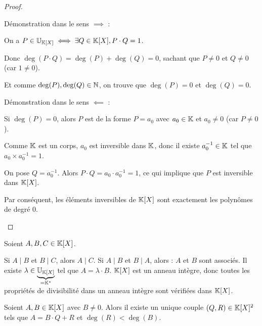 \documentclass[12pt,a4paper]{report}
\begin{document}
\begin{proof}
    \begin{outline}
        \1 Démonstration dans le sens $\implies$ :

        \2 On a $P \in \mathbb{U}_{\mathbb{K}[X]} \iff \exists Q \in \mathbb{K}[X], P\cdot Q = 1$.

        \2 Donc $\deg(P\cdot Q) = \deg(P) + \deg(Q) = 0$, sachant que $P \ne 0$ et $Q \ne 0$ (car $1 \ne 0$).

        \2 Et comme $\deg(P), \deg(Q) \in \mathbb{N}$, on trouve que $\deg(P) = 0$ et $\deg(Q) = 0$.

        \1 Démonstration dans le sens $\impliedby$ :

        \2 Si $\deg(P) = 0$, alors $P$ est de la forme $P = a_0$ avec $a_0 \in \mathbb{K}$ et $a_0 \ne 0$ (car $P \ne 0$).

        \2 Comme $\mathbb{K}$ est un corps, $a_0$ est inversible dans $\mathbb{K}$, donc il existe $a_0^{-1} \in \mathbb{K}$ tel que $a_0 \times a_0^{-1} = 1$.

        \2 On pose $Q = a_0^{-1}$. Alors $P\cdot Q = a_0 \cdot a_0^{-1} = 1$, ce qui implique que $P$ est inversible dans $\mathbb{K}[X]$.

        \1 Par conséquent, les éléments inversibles de $\mathbb{K}[X]$ sont exactement les polynômes de degré 0.
    \end{outline}

\end{proof}

\begin{property}
    Soient $A,B,C \in \mathbb{K}[X]$.
    \begin{outline}[enumerate]
        \1 Si $A \mid B$ et $B \mid C$, alors $A \mid C$.
        \1 Si $A \mid B$ et $B \mid A$, alors :
        \2 $A$ et $B$ sont associés.
        \2 Il existe $\lambda \in \underbrace{\mathbb{U}_{\mathbb{K}[X]}}_{=\mathbb{K}^*}$ tel que $A = \lambda \cdot B$.
        \1 $\mathbb{K}[X]$ est un anneau intègre, donc toutes les propriétés de divisibilité dans un anneau intègre sont vérifiées dans $\mathbb{K}[X]$.
    \end{outline}
\end{property}

\begin{theorem}
    Soient $A,B \in \mathbb{K}[X]$ avec $B \ne 0$. 
    Alors il existe un unique couple $(Q,R) \in \mathbb{K}[X]^2$ tels que $A = B\cdot Q + R$ et $\deg(R) < \deg(B)$.
\end{theorem}
\end{document}

